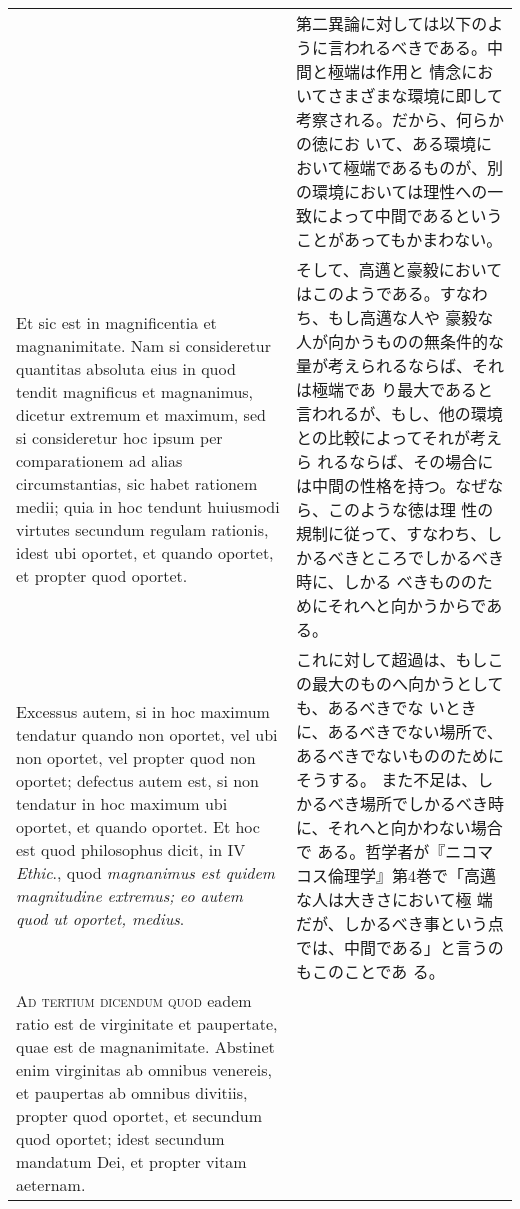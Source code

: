 \documentclass[10pt]{jsarticle}
\begin{document}
\begin{longtable}{p{21em}p{21em}}
&

 第二異論に対しては以下のように言われるべきである。中間と極端は作用と
 情念においてさまざまな環境に即して考察される。だから、何らかの徳にお
 いて、ある環境において極端であるものが、別の環境においては理性への一
 致によって中間であるということがあってもかまわない。

\\

 Et sic est in magnificentia et magnanimitate. Nam si consideretur
quantitas absoluta eius in quod tendit magnificus et magnanimus,
dicetur extremum et maximum, sed si consideretur hoc ipsum per
comparationem ad alias circumstantias, sic habet rationem medii; quia
in hoc tendunt huiusmodi virtutes secundum regulam rationis, idest ubi
oportet, et quando oportet, et propter quod oportet.

&

 そして、高邁と豪毅においてはこのようである。すなわち、もし高邁な人や
 豪毅な人が向かうものの無条件的な量が考えられるならば、それは極端であ
 り最大であると言われるが、もし、他の環境との比較によってそれが考えら
 れるならば、その場合には中間の性格を持つ。なぜなら、このような徳は理
 性の規制に従って、すなわち、しかるべきところでしかるべき時に、しかる
 べきもののためにそれへと向かうからである。

\\



 Excessus autem, si in hoc maximum tendatur quando non oportet, vel
ubi non oportet, vel propter quod non oportet; defectus autem est, si
non tendatur in hoc maximum ubi oportet, et quando oportet. Et hoc est
quod philosophus dicit, in IV {\itshape Ethic}., quod {\itshape
magnanimus est quidem magnitudine extremus; eo autem quod ut oportet,
medius}.

&

 これに対して超過は、もしこの最大のものへ向かうとしても、あるべきでな
 いときに、あるべきでない場所で、あるべきでないもののためにそうする。
 また不足は、しかるべき場所でしかるべき時に、それへと向かわない場合で
 ある。哲学者が『ニコマコス倫理学』第4巻で「高邁な人は大きさにおいて極
 端だが、しかるべき事という点では、中間である」と言うのもこのことであ
 る。

\\


 {\scshape Ad tertium dicendum quod} eadem ratio est de virginitate et
 paupertate, quae est de magnanimitate. Abstinet enim virginitas ab
 omnibus venereis, et paupertas ab omnibus divitiis, propter quod
 oportet, et secundum quod oportet; idest secundum mandatum Dei, et
 propter vitam aeternam.


\end{longtable}
\end{document}
